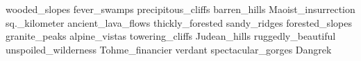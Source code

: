 wooded\_slopes fever\_swamps precipitous\_cliffs barren\_hills Maoist\_insurrection sq.\_kilometer ancient\_lava\_flows thickly\_forested sandy\_ridges forested\_slopes granite\_peaks alpine\_vistas towering\_cliffs Judean\_hills ruggedly\_beautiful unspoiled\_wilderness Tohme\_financier verdant spectacular\_gorges Dangrek 
